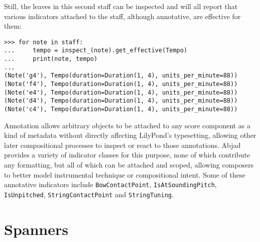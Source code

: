 \noindent Still, the leaves in this second staff can be inspected and will all
report that various indicators attached to the staff, although annotative, are
effective for them:

\begin{comment}
<abjad>
for note in staff:
    tempo = inspect_(note).get_effective(Tempo)
    print(note, tempo)

</abjad>
\end{comment}

\begin{abjadbookoutput}
\begin{singlespacing}
\vspace{-0.5\baselineskip}
\begin{verbatim}
>>> for note in staff:
...     tempo = inspect_(note).get_effective(Tempo)
...     print(note, tempo)
...
(Note('g4'), Tempo(duration=Duration(1, 4), units_per_minute=88))
(Note('f4'), Tempo(duration=Duration(1, 4), units_per_minute=88))
(Note('e4'), Tempo(duration=Duration(1, 4), units_per_minute=88))
(Note('d4'), Tempo(duration=Duration(1, 4), units_per_minute=88))
(Note('c4'), Tempo(duration=Duration(1, 4), units_per_minute=88))
\end{verbatim}
\end{singlespacing}
\end{abjadbookoutput}

\noindent Annotation allows arbitrary objects to be attached to any score
component as a kind of metadata without directly affecting LilyPond's
typesetting, allowing other later compositional processes to inspect or react
to those annotations. Abjad provides a variety of indicator classes for this
purpose, none of which contribute any formatting, but all of which can be
attached and scoped, allowing composers to better model instrumental technique
or compositional intent. Some of these annotative indicators include
\texttt{BowContactPoint}, \texttt{IsAtSoundingPitch}, \texttt{IsUnpitched},
\texttt{StringContactPoint} and \texttt{StringTuning}.

\section{Spanners}
\label{sec:spanners}

